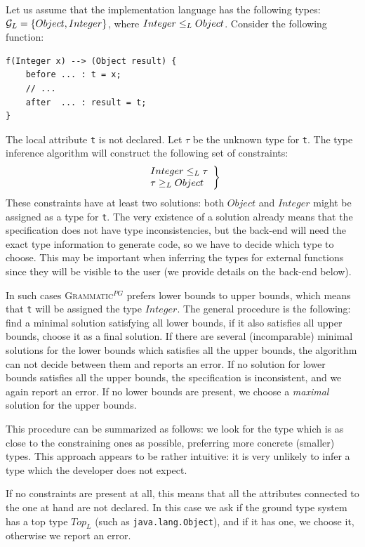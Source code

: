\documentclass{informat} %
\newcommand{\ATF}{\textsc{Grammatic}$^{PG}$}
\begin{document}
Let us assume that the implementation language has the following types: ${\mathcal{G}_L} = \{Object, Integer\}$, where $Integer \le_L Object$. Consider the following function:
\begin{lstlisting}[language=Grammatic]
f(Integer x) --> (Object result) {
	before ... : t = x;
	// ...
	after  ... : result = t;
}
\end{lstlisting}
The local attribute \texttt{t} is not declared. Let $\tau$ be the unknown type for \texttt{t}. The type inference algorithm will construct the following set of constraints:
$$\left.\begin{array}{l}
Integer \le_L \tau\\
\tau \ge_L Object\\
\end{array}\right\}$$
These constraints have at least two solutions: both $Object$ and $Integer$ might be assigned as a type for \texttt{t}. The very existence of a solution already means that the specification does not have type inconsistencies, but the back-end will need the exact type information to generate code, so we have to decide which type to choose. This may be important when inferring the types for external functions since they will be visible to the user (we provide details on the back-end below).

In such cases \ATF{} prefers lower bounds to upper bounds, which means that \texttt{t} will be assigned the type $Integer$. The general procedure is the following: find a minimal solution satisfying all lower bounds, if it also satisfies all upper bounds, choose it as a final solution. If there are several (incomparable) minimal solutions for the lower bounds which satisfies all the upper bounds, the algorithm can not decide between them and reports an error. If no solution for lower bounds satisfies all the upper bounds, the specification is inconsistent, and we again report an error. If no lower bounds are present, we choose a \emph{maximal} solution for the upper bounds. 

This procedure can be summarized as follows: we look for the type which is as close to the constraining ones as possible, preferring more concrete (smaller) types. This approach appears to be rather intuitive: it is very unlikely to infer a type which the developer does not expect.

If no constraints are present at all, this means that all the attributes connected to the one at hand are not declared. In this case we ask if the ground type system has a top type $Top_L$ (such as \texttt{java.lang.Object}), and if it has one, we choose it, otherwise we report an error.
\end{document}
